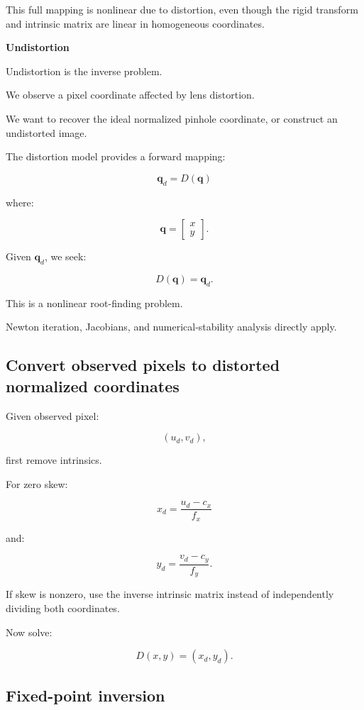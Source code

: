 This full mapping is nonlinear due to distortion, even though the rigid transform and intrinsic matrix are linear in homogeneous coordinates.

\textbf{Undistortion}

Undistortion is the inverse problem.

We observe a pixel coordinate affected by lens distortion.

We want to recover the ideal normalized pinhole coordinate, or construct an undistorted image.

The distortion model provides a forward mapping:

\[
 \boxed{ \mathbf q_d=D(\mathbf q) }
\]

where:

\[
 \mathbf q= \begin{bmatrix}x\\y\end{bmatrix}.
\]

Given \(\mathbf q_d\), we seek:

\[
 \boxed{ D(\mathbf q)=\mathbf q_d }.
\]

This is a nonlinear root-finding problem.

Newton iteration, Jacobians, and numerical-stability analysis directly apply.

\subsection{Convert observed pixels to distorted normalized coordinates}\label{02-foundations-ii-ch035-convert-observed-pixels-to-distorted-normalized-coordinates}

Given observed pixel:

\[
 (u_d,v_d),
\]

first remove intrinsics.

For zero skew:

\[
 \boxed{ x_d=\frac{u_d-c_x}{f_x} }
\]

and:

\[
 \boxed{ y_d=\frac{v_d-c_y}{f_y} }.
\]

If skew is nonzero, use the inverse intrinsic matrix instead of independently dividing both coordinates.

Now solve:

\[
 D(x,y)=(x_d,y_d).
\]

\subsection{Fixed-point inversion}\label{02-foundations-ii-ch035-fixed-point-inversion}

